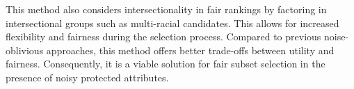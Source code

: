 


This method also considers intersectionality in fair rankings by factoring in intersectional groups such as multi-racial candidates. This allows for increased flexibility and fairness during the selection process.
%
Compared to previous noise-oblivious approaches, this method offers better trade-offs between utility and fairness. Consequently, it is a viable solution for fair subset selection in the presence of noisy protected attributes.

